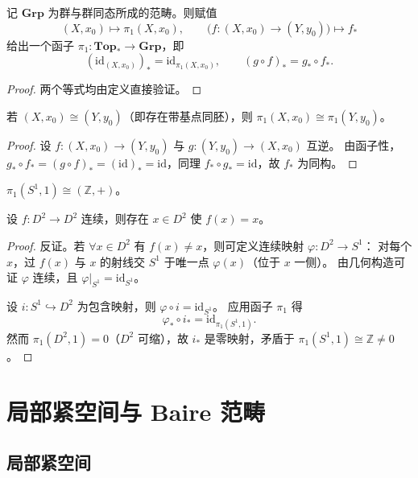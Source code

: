 \documentclass[lang=cn,a4paper,newtx,figureplace=section,tableplace=section]{elegantbook}
\begin{document}
\begin{proposition}\label{prop:pi1-functor}
  记 $\mathbf{Grp}$ 为群与群同态所成的范畴。则赋值
  \[
    (X,x_0)\longmapsto \pi_1(X,x_0),\qquad \bigl(f:(X,x_0)\to(Y,y_0)\bigr)\longmapsto f_*
  \]
  给出一个函子 $\pi_1:\mathbf{Top}_*\to\mathbf{Grp}$，即
  \[
    (\mathrm{id}_{(X,x_0)})_* = \mathrm{id}_{\pi_1(X,x_0)},\qquad (g\circ f)_* = g_*\circ f_*.
  \]
\end{proposition}
\begin{proof}
  两个等式均由定义直接验证。
\end{proof}

\begin{corollary}\label{cor:pointed-homeo-implies-pi1-iso}
  若 $(X,x_0)\cong(Y,y_0)$（即存在带基点同胚），则 $\pi_1(X,x_0)\cong\pi_1(Y,y_0)$。
\end{corollary}
\begin{proof}
  设 $f:(X,x_0)\to(Y,y_0)$ 与 $g:(Y,y_0)\to(X,x_0)$ 互逆。
  由函子性，$g_*\circ f_*=(g\circ f)_*=(\mathrm{id})_*=\mathrm{id}$，同理 $f_*\circ g_*=\mathrm{id}$，故 $f_*$ 为同构。
\end{proof}

\begin{theorem}\label{thm:pi1-circle}
  $\pi_1(S^1,1)\cong(\mathbb Z,+)$。
\end{theorem}

\begin{theorem}\label{thm:brouwer-2d}
  设 $f:D^2\to D^2$ 连续，则存在 $x\in D^2$ 使 $f(x)=x$。
\end{theorem}
\begin{proof}
  反证。若 $\forall x\in D^2$ 有 $f(x)\neq x$，则可定义连续映射 $\varphi:D^2\to S^1$：
  对每个 $x$，过 $f(x)$ 与 $x$ 的射线交 $S^1$ 于唯一点 $\varphi(x)$（位于 $x$ 一侧）。
  由几何构造可证 $\varphi$ 连续，且 $\varphi|_{S^1}=\mathrm{id}_{S^1}$。

  设 $i:S^1\hookrightarrow D^2$ 为包含映射，则 $\varphi\circ i=\mathrm{id}_{S^1}$。
  应用函子 $\pi_1$ 得
  \[
    \varphi_*\circ i_*=\mathrm{id}_{\pi_1(S^1,1)}.
  \]
  然而 $\pi_1(D^2,1)=0$（$D^2$ 可缩），故 $i_*$ 是零映射，矛盾于 $\pi_1(S^1,1)\cong\mathbb Z\neq 0$。
\end{proof}

\chapter{局部紧空间与 Baire 范畴}

\section{局部紧空间}
\end{document}
